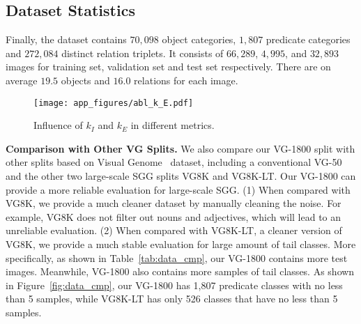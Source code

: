 \documentclass[runningheads]{llncs}
\begin{document}
\subsection{Dataset Statistics}
Finally, the dataset contains $70,098$ object categories, $1,807$ predicate categories and $272,084$ distinct relation triplets.
It consists of $66,289$, $4,995$, and $32,893$ images for training set, validation set and test set respectively.
There are on average $19.5$ objects and $16.0$ relations for each image.


\begin{figure*}
    \centering
    \texttt{[image: app\_figures/abl\_k\_E.pdf]}
    \caption{Influence of $k_I$ and $k_E$ in different metrics.}
    \label{fig:abl_kIE}
\end{figure*}




\smallskip
\noindent
\textbf{Comparison with Other VG Splits.}
We also compare our VG-1800 split with other splits based on Visual Genome~\cite{krishna2017visual} dataset, including a conventional VG-50 and the other two large-scale SGG splits VG8K and VG8K-LT.
Our VG-1800 can provide a more reliable evaluation for large-scale SGG.
(1) When compared with VG8K, we provide a much cleaner dataset by manually cleaning the noise.
For example, VG8K does not filter out nouns and adjectives, which will lead to an unreliable evaluation.
(2) When compared with VG8K-LT, a cleaner version of VG8K, we provide a much stable evaluation for large amount of tail classes.
More specifically, as shown in Table~\ref{tab:data_cmp}, our VG-1800 contains more test images.
Meanwhile, VG-1800 also contains more samples of tail classes.
As shown in Figure~\ref{fig:data_cmp}, our VG-1800 has 1,807 predicate classes with no less than 5 samples, while VG8K-LT has only 526 classes that have no less than 5 samples.


\begin{table}[]
    \setlength{\tabcolsep}{15pt}
    \centering
    \caption{Comparison between different datasets' predicate filtration and split ratio. Filtration denotes the method to remove noisy predicates. The Train, Val, and Test denote number of images in training set, validation set and test set.}
    \label{tab:data_cmp}


\end{table}
\end{document}
